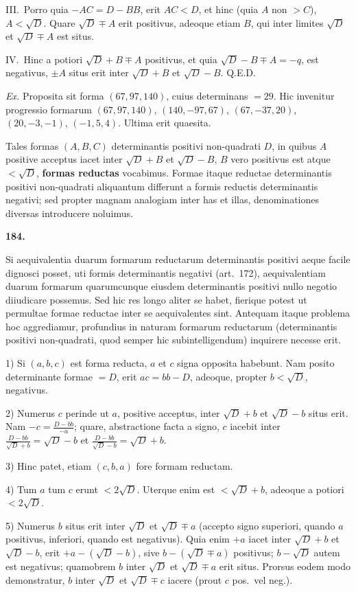 \documentclass[12pt,a4paper]{article}
\theoremstyle{plain}
\theoremstyle{definition}
\theoremstyle{remark}
\newcommand{\qeode}{\textsc{Q.E.D.}}
\begin{document}
III.\ Porro quia $-AC=D-BB$, erit $AC<D$, et hinc (quia $A$ non $>C$), $A<\sqrt{D}$. Quare $\sqrt{D}\mp A$ erit positivus, adeoque etiam $B$, qui inter limites $\sqrt{D}$ et $\sqrt{D}\mp A$ est situs.

IV.\ Hinc a potiori $\sqrt{D}+B\mp A$ positivus, et quia $\sqrt{D}-B\mp A=-q$, est negativus, $\pm A$ situs erit inter $\sqrt{D}+B$ et $\sqrt{D}-B$. \qeode

\textit{Ex.} Proposita sit forma $(67,97,140)$, cuius determinans $=29$. Hic invenitur progressio formarum $(67,97,140)$, $(140,-97,67)$, $(67,-37,20)$, $(20,-3,-1)$, $(-1,5,4)$. Ultima erit quaesita.

Tales formas $(A,B,C)$ determinantis positivi non-quadrati $D$, in quibus $A$ positive acceptus iacet inter $\sqrt{D}+B$ et $\sqrt{D}-B$, $B$ vero positivus est atque $<\sqrt{D}$, \textbf{formas reductas} vocabimus. Formae itaque reductae determinantis positivi non-quadrati aliquantum differunt a formis reductis determinantis negativi; sed propter magnam analogiam inter has et illas, denominationes diversas introducere noluimus.

\textbf{184.}

Si aequivalentia duarum formarum reductarum determinantis positivi aeque facile dignosci posset, uti formis determinantis negativi (art.\ 172), aequivalentiam duarum formarum quarumcunque eiusdem determinantis positivi nullo negotio diiudicare possemus. Sed hic res longo aliter se habet, fierique potest ut permultae formae reductae inter se aequivalentes sint. Antequam itaque problema hoc aggrediamur, profundius in naturam formarum reductarum (determinantis positivi non-quadrati, quod semper hic subintelligendum) inquirere necesse erit.

1) Si $(a,b,c)$ est forma reducta, $a$ et $c$ signa opposita habebunt. Nam posito determinante formae $=D$, erit $ac=bb-D$, adeoque, propter $b<\sqrt{D}$, negativus.

2) Numerus $c$ perinde ut $a$, positive acceptus, inter $\sqrt{D}+b$ et $\sqrt{D}-b$ situs erit. Nam $-c=\frac{D-bb}{-a}$; quare, abstractione facta a signo, $c$ iacebit inter $\frac{D-bb}{\sqrt{D}+b}=\sqrt{D}-b$ et $\frac{D-bb}{\sqrt{D}-b}=\sqrt{D}+b$.

3) Hinc patet, etiam $(c,b,a)$ fore formam reductam.

4) Tum $a$ tum $c$ erunt $<2\sqrt{D}$. Uterque enim est $<\sqrt{D}+b$, adeoque a potiori $<2\sqrt{D}$.

5) Numerus $b$ situs erit inter $\sqrt{D}$ et $\sqrt{D}\mp a$ (accepto signo superiori, quando $a$ positivus, inferiori, quando est negativus). Quia enim $+a$ iacet inter $\sqrt{D}+b$ et $\sqrt{D}-b$, erit $+a-(\sqrt{D}-b)$, sive $b-(\sqrt{D}\mp a)$ positivus; $b-\sqrt{D}$ autem est negativus; quamobrem $b$ inter $\sqrt{D}$ et $\sqrt{D}\mp a$ erit situs. Prorsus eodem modo demonstratur, $b$ inter $\sqrt{D}$ et $\sqrt{D}\mp c$ iacere (prout $c$ pos.\ vel neg.).
\end{document}
